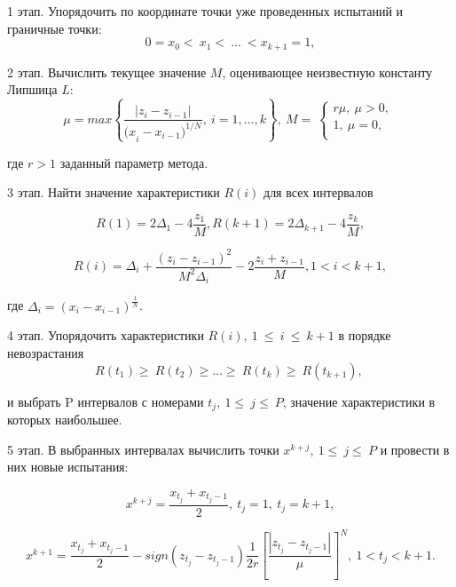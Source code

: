 \documentclass[10pt,a4paper]{book}
\begin{document}
 1 этап. Упорядочить по координате точки уже проведенных испытаний и граничные точки:
 \begin{equation}
\label{agp1_sort}
	0=x_0<\ x_1<\ ...\ <x_{k+1}=1,
	\end{equation}
	
2 этап. Вычислить текущее значение $M$, оценивающее неизвестную константу Липшица $L$:
 \begin{equation}
\label{agp2_mu}
	\mu=max\left\{\frac{|z_i-z_{i-1}|}{{{(x}_i-x_{i-1})}^{1/N}},\ i=1,\ldots,k\right\},\ M=\ \left\{\begin{matrix}r\mu,\ \mu>0,\\1,\ \mu=0,\\\end{matrix}\right.\
		\end{equation}

   где $r>1$ заданный параметр метода.
   
3 этап. Найти значение характеристики $R(i)$ для всех интервалов

\begin{equation}
\label{agp3_R1}
R(1)=2\Delta_1-4\dfrac{z_1}{M},R(k+1)=2\Delta_{k+1}-4\dfrac{z_k}{M},
\end{equation}

\begin{equation}
\label{agp3_Ri}
R(i)=\Delta_i+\dfrac{(z_i-z_{i-1})^2}{M^2\Delta_i}-2\dfrac{z_i+z_{i-1}}{M},1<i<k+1,
\end{equation}

   где \(\Delta_i=(x_i-x_{i-1})^\frac{1}{N}\).
   
4 этап.  Упорядочить характеристики $R\left(i\right),\ 1\ \le\ i\ \le\ k+1$ в порядке невозрастания 
\begin{equation}
\label{agp4_R_sort}
	R\left(t_1\right)\geq\ R\left(t_2\right)\geq...\geq\ R\left(t_k\right)\geq\ R(t_{k+1}),\ 
\end{equation}	
	
и выбрать P интервалов с номерами $t_j,\ 1\le\ j\le\ P$, значение характеристики в которых наибольшее.

5 этап. В выбранных интервалах вычислить точки $x^{k+j},\ 1\le\ j\le\ P$ и провести в них новые испытания:

\begin{equation}
\label{agp5_x1}
	x^{k+j}=\frac{x_{t_j}+x_{t_j-1}}{2},\ t_j=1,\ t_j=k+1,
\end{equation}	
	
\begin{equation}
\label{agp4_xi}	
	x^{k+1}=\frac{x_{t_j}+x_{t_j-1}}{2}-sign\left(z_{t_j}-z_{t_j-1}\right)\frac{1}{2r}\left[\frac{\left|z_{t_j}-z_{t_j-1}\right|}{\mu}\right]^N,\ 1<t_j<k+1.
\end{equation}	
\end{document}

